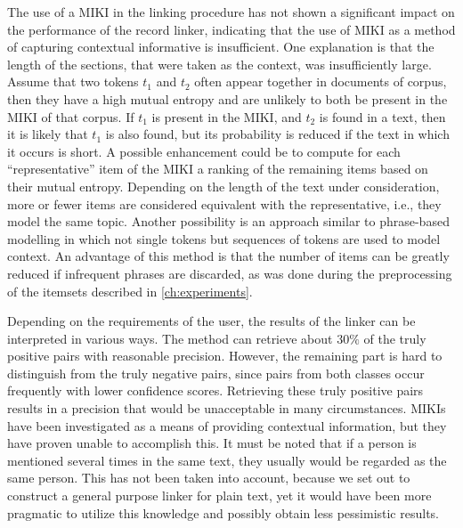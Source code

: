 The use of a MIKI in the linking procedure has not shown a significant impact on the performance of the record linker, indicating that the use of MIKI as a method of capturing contextual informative is insufficient.
One explanation is that the length of the sections, that were taken as the context, was insufficiently large.
Assume that two tokens $t_1$ and $t_2$ often appear together in documents of corpus, then they have a high mutual entropy and are unlikely to both be present in the MIKI of that corpus.
If $t_1$ is present in the MIKI, and $t_2$ is found in a text, then it is likely that $t_1$ is also found, but its probability is reduced if the text in which it occurs is short.
A possible enhancement could be to compute for each ``representative'' item of the MIKI a ranking of the remaining items based on their mutual entropy.
Depending on the length of the text under consideration, more or fewer items are considered equivalent with the representative, i.e., they model the same topic.
Another possibility is an approach similar to phrase-based modelling \citep{Lin2009} in which not single tokens but sequences of tokens are used to model context.
An advantage of this method is that the number of items can be greatly reduced if infrequent phrases are discarded, as was done during the preprocessing of the itemsets described in \cref{ch:experiments}.

Depending on the requirements of the user, the results of the linker can be interpreted in various ways.
The method can retrieve about $30\%$ of the truly positive pairs with reasonable precision.
However, the remaining part is hard to distinguish from the truly negative pairs, since pairs from both classes occur frequently with lower confidence scores.
Retrieving these truly positive pairs results in a precision that would be unacceptable in many circumstances.
MIKIs have been investigated as a means of providing contextual information, but they have proven unable to accomplish this.
It must be noted that if a person is mentioned several times in the same text, they usually would be regarded as the same person.
This has not been taken into account, because we set out to construct a general purpose linker for plain text, yet it would have been more pragmatic to utilize this knowledge and possibly obtain less pessimistic results.

